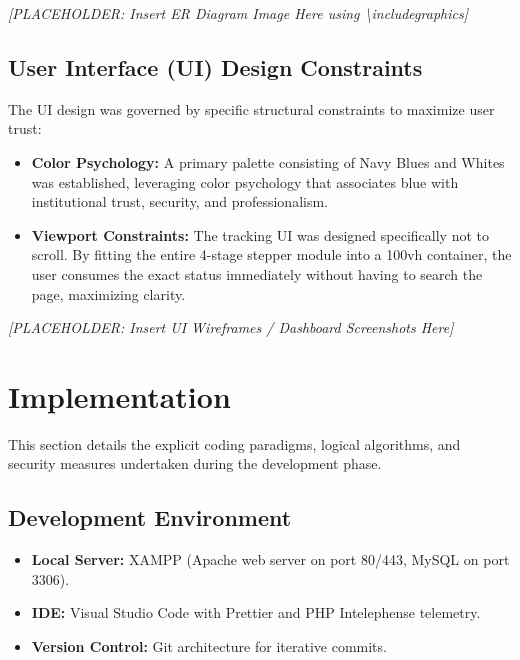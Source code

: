 \documentclass[12pt, a4paper]{article}
\begin{document}
\vspace{1cm}
\begin{center}
    \textit{[PLACEHOLDER: Insert ER Diagram Image Here using \textbackslash includegraphics]}
\end{center}
\vspace{1cm}

\subsection{User Interface (UI) Design Constraints}
The UI design was governed by specific structural constraints to maximize user trust:
\begin{itemize}
    \item \textbf{Color Psychology:} A primary palette consisting of Navy Blues and Whites was established, leveraging color psychology that associates blue with institutional trust, security, and professionalism.
    \item \textbf{Viewport Constraints:} The tracking UI was designed specifically not to scroll. By fitting the entire 4-stage stepper module into a 100vh container, the user consumes the exact status immediately without having to search the page, maximizing clarity.
\end{itemize}

\vspace{1cm}
\begin{center}
    \textit{[PLACEHOLDER: Insert UI Wireframes / Dashboard Screenshots Here]}
\end{center}
\vspace{1cm}

\newpage

\section{Implementation}

This section details the explicit coding paradigms, logical algorithms, and security measures undertaken during the development phase.

\subsection{Development Environment}
\begin{itemize}
    \item \textbf{Local Server:} XAMPP (Apache web server on port 80/443, MySQL on port 3306).
    \item \textbf{IDE:} Visual Studio Code with Prettier and PHP Intelephense telemetry.
    \item \textbf{Version Control:} Git architecture for iterative commits.
\end{itemize}
\end{document}
